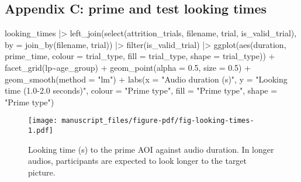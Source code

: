 \documentclass[
  letterpaper,
  DIV=11,
  numbers=noendperiod]{scrartcl}
\newenvironment{Shaded}{\begin{snugshade}}{\end{snugshade}}
\newcommand{\AttributeTok}[1]{\textcolor[rgb]{0.40,0.45,0.13}{#1}}
\newcommand{\FloatTok}[1]{\textcolor[rgb]{0.68,0.00,0.00}{#1}}
\newcommand{\FunctionTok}[1]{\textcolor[rgb]{0.28,0.35,0.67}{#1}}
\newcommand{\NormalTok}[1]{\textcolor[rgb]{0.00,0.23,0.31}{#1}}
\newcommand{\SpecialCharTok}[1]{\textcolor[rgb]{0.37,0.37,0.37}{#1}}
\newcommand{\StringTok}[1]{\textcolor[rgb]{0.13,0.47,0.30}{#1}}
\begin{document}
\hypertarget{appendix-c-prime-and-test-looking-times}{%
\subsection{Appendix C: prime and test looking
times}\label{appendix-c-prime-and-test-looking-times}}

\begin{Shaded}
\begin{Highlighting}[]
\NormalTok{looking\_times }\SpecialCharTok{|\textgreater{}}
    \FunctionTok{left\_join}\NormalTok{(}\FunctionTok{select}\NormalTok{(attrition\_trials, }
\NormalTok{                     filename, trial, is\_valid\_trial),}
              \AttributeTok{by =} \FunctionTok{join\_by}\NormalTok{(filename, trial)) }\SpecialCharTok{|\textgreater{}}
    \FunctionTok{filter}\NormalTok{(is\_valid\_trial) }\SpecialCharTok{|\textgreater{}} 
    \FunctionTok{ggplot}\NormalTok{(}\FunctionTok{aes}\NormalTok{(duration,}
\NormalTok{               prime\_time,}
               \AttributeTok{colour =}\NormalTok{ trial\_type, }
               \AttributeTok{fill =}\NormalTok{ trial\_type,}
               \AttributeTok{shape =}\NormalTok{ trial\_type)) }\SpecialCharTok{+}
    \FunctionTok{facet\_grid}\NormalTok{(lp}\SpecialCharTok{\textasciitilde{}}\NormalTok{age\_group) }\SpecialCharTok{+}
    \FunctionTok{geom\_point}\NormalTok{(}\AttributeTok{alpha =} \FloatTok{0.5}\NormalTok{, }
               \AttributeTok{size =} \FloatTok{0.5}\NormalTok{) }\SpecialCharTok{+}
    \FunctionTok{geom\_smooth}\NormalTok{(}\AttributeTok{method =} \StringTok{"lm"}\NormalTok{) }\SpecialCharTok{+}
    \FunctionTok{labs}\NormalTok{(}\AttributeTok{x =} \StringTok{"Audio duration (s)"}\NormalTok{,}
         \AttributeTok{y =} \StringTok{"Looking time (1.0{-}2.0 seconds)"}\NormalTok{,}
         \AttributeTok{colour =} \StringTok{"Prime type"}\NormalTok{,}
         \AttributeTok{fill =} \StringTok{"Prime type"}\NormalTok{,}
         \AttributeTok{shape =} \StringTok{"Prime type"}\NormalTok{)}
\end{Highlighting}
\end{Shaded}

\begin{figure}[H]

{\centering \texttt{[image: manuscript\_files/figure-pdf/fig-looking-times-1.pdf]}

}

\caption{\label{fig-looking-times}Looking time (s) to the prime AOI
against audio duration. In longer audios, participants are expected to
look longer to the target picture.}

\end{figure}
\end{document}

